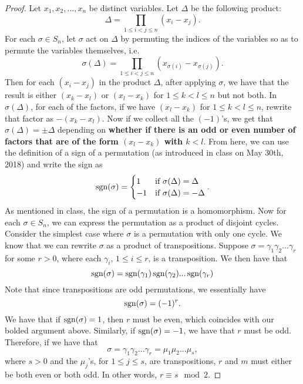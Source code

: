 \begin{proof}
  Let $x_1, x_2, ..., x_n$ be distinct variables. Let $\Delta$ be the following product:
  \begin{equation*}
    \Delta = \prod_{1 \leq i < j \leq n} (x_i - x_j).
  \end{equation*}
  For each $\sigma \in S_n$, let $\sigma$ act on $\Delta$ by permuting the indices of the variables so as to permute the variables themselves, i.e.
  \begin{equation*}
    \sigma( \Delta ) = \prod_{1 \leq i < j \leq n} ( x_{\sigma(i)} - x_{\sigma(j)} ).
  \end{equation*}
  Then for each $(x_i - x_j)$ in the product $\Delta$, after applying $\sigma$, we have that the result is either $(x_k - x_l)$ or $(x_l - x_k)$ for $1 \leq k < l \leq n$ but not both. In $\sigma(\Delta)$, for each of the factors, if we have $(x_l - x_k)$ for $1 \leq k < l \leq n$, rewrite that factor as $- (x_k - x_l)$. Now if we collect all the $(-1)$'s, we get that $\sigma(\Delta) = \pm \Delta$ depending on \textbf{whether if there is an odd or even number of factors that are of the form $(x_l - x_k)$ with $k < l$}. From here, we can use the definition of a sign of a permutation (as introduced in class on May 30th, 2018) and write the sign as
  \begin{equation*}
    \operatorname{sgn}(\sigma) = \begin{cases}
      1 & \text{if } \sigma(\Delta) = \Delta \\
      -1 & \text{if } \sigma(\Delta) = -\Delta
    \end{cases}.
  \end{equation*}
  As mentioned in class, the sign of a permutation is a homomorphism. Now for each $\sigma \in S_n$, we can express the permutation as a product of disjoint cycles. Consider the simplest case where $\sigma$ is a permutation with only one cycle. We know that we can rewrite $\sigma$ as a product of transpositions. Suppose $\sigma = \gamma_1 \gamma_2 ... \gamma_r$ for some $r > 0$, where each $\gamma_i$, $1 \leq i \leq r$, is a transposition. We then have that
  \begin{equation*}
    \operatorname{sgn}(\sigma) = \operatorname{sgn}(\gamma_1) \operatorname{sgn}(\gamma_2) ... \operatorname{sgn}(\gamma_r)
  \end{equation*}
  Note that since transpositions are odd permutations, we essentially have
  \begin{equation*}
    \operatorname{sgn}(\sigma) = (-1)^r.
  \end{equation*}
  We have that if $\operatorname{sgn}(\sigma) = 1$, then $r$ must be even, which coincides with our bolded argument above. Similarly, if $\operatorname{sgn}(\sigma) = -1$, we have that $r$ must be odd. Therefore, if we have that
  \begin{equation*}
    \sigma = \gamma_1 \gamma_2 ... \gamma_r = \mu_1 \mu_2 ... \mu_s,
  \end{equation*}
  where $s > 0$ and the $\mu_j$'s, for $1 \leq j \leq s$, are transpositions, $r$ and $m$ must either be both even or both odd. In other words, $r \equiv s \mod 2$.
  

\end{proof}
